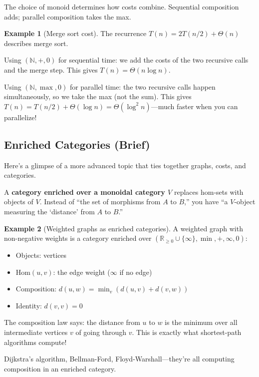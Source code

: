 \documentclass[11pt]{article}
\newcommand{\N}{\mathbb{N}}
\newcommand{\R}{\mathbb{R}}
\newcommand{\Hom}{\mathrm{Hom}}
\theoremstyle{definition}
\newtheorem{example}{Example}[section]
\theoremstyle{plain}
\theoremstyle{remark}
\begin{document}
The choice of monoid determines how costs combine. Sequential composition adds; parallel composition takes the max.

\begin{example}[Merge sort cost]
The recurrence $T(n) = 2T(n/2) + \Theta(n)$ describes merge sort.

Using $(\N, +, 0)$ for sequential time: we add the costs of the two recursive calls and the merge step. This gives $T(n) = \Theta(n \log n)$.

Using $(\N, \max, 0)$ for parallel time: the two recursive calls happen simultaneously, so we take the max (not the sum). This gives $T(n) = T(n/2) + \Theta(\log n) = \Theta(\log^2 n)$---much faster when you can parallelize!
\end{example}

\subsection{Enriched Categories (Brief)}

Here's a glimpse of a more advanced topic that ties together graphs, costs, and categories.

A \textbf{category enriched over a monoidal category $V$} replaces hom-sets with objects of $V$. Instead of ``the set of morphisms from $A$ to $B$,'' you have ``a $V$-object measuring the `distance' from $A$ to $B$.''

\begin{example}[Weighted graphs as enriched categories]
A weighted graph with non-negative weights is a category enriched over $(\R_{\geq 0} \cup \{\infty\}, \min, +, \infty, 0)$:
\begin{itemize}
  \item Objects: vertices
  \item $\Hom(u, v)$: the edge weight ($\infty$ if no edge)
  \item Composition: $d(u, w) = \min_v (d(u, v) + d(v, w))$
  \item Identity: $d(v, v) = 0$
\end{itemize}

The composition law says: the distance from $u$ to $w$ is the minimum over all intermediate vertices $v$ of going through $v$. This is exactly what shortest-path algorithms compute!

Dijkstra's algorithm, Bellman-Ford, Floyd-Warshall---they're all computing composition in an enriched category.
\end{example}
\end{document}
